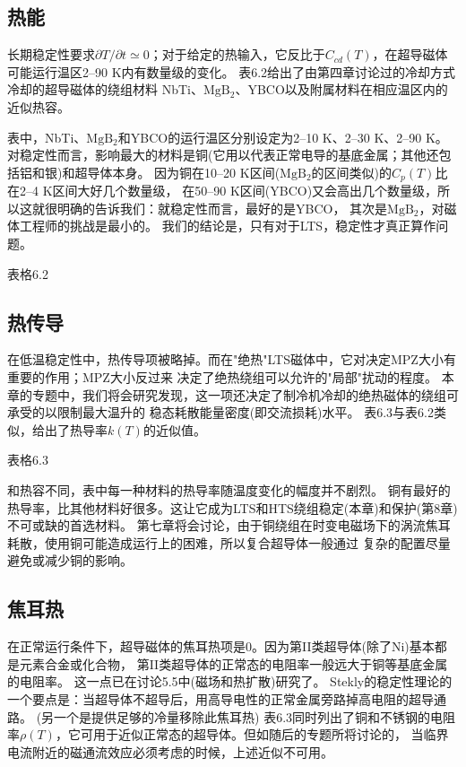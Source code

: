 \subsection{热能}
长期稳定性要求$\partial T/\partial t\simeq 0$；对于给定的热输入，它反比于$C_{cd}(T)$，在超导磁体
可能运行温区2--90 K内有数量级的变化。
表6.2给出了由第四章讨论过的冷却方式冷却的超导磁体的绕组材料
NbTi、$\mathrm{MgB_2}$、YBCO以及附属材料在相应温区内的近似热容。

表中，NbTi、$\mathrm{MgB_2}$和YBCO的运行温区分别设定为2--10 K、2--30 K、2--90 K。
对稳定性而言，影响最大的材料是铜(它用以代表正常电导的基底金属；其他还包括铝和银)和超导体本身。
因为铜在10--20 K区间($\mathrm{MgB_2}$的区间类似)的$C_p(T)$比在2--4 K区间大好几个数量级，
在50--90 K区间(YBCO)又会高出几个数量级，所以这就很明确的告诉我们：就稳定性而言，最好的是YBCO，
其次是$\mathrm{MgB_2}$，对磁体工程师的挑战是最小的。
我们的结论是，只有对于LTS，稳定性才真正算作问题。

表格6.2

\subsection{热传导}
在低温稳定性中，热传导项被略掉。而在"绝热"LTS磁体中，它对决定MPZ大小有重要的作用；MPZ大小反过来
决定了绝热绕组可以允许的"局部"扰动的程度。
本章的专题中，我们将会研究发现，这一项还决定了制冷机冷却的绝热磁体的绕组可承受的以限制最大温升的
稳态耗散能量密度(即交流损耗)水平。
表6.3与表6.2类似，给出了热导率$k(T)$的近似值。

表格6.3

和热容不同，表中每一种材料的热导率随温度变化的幅度并不剧烈。
铜有最好的热导率，比其他材料好很多。这让它成为LTS和HTS绕组稳定(本章)和保护(第8章)不可或缺的首选材料。
第七章将会讨论，由于铜绕组在时变电磁场下的涡流焦耳耗散，使用铜可能造成运行上的困难，所以复合超导体一般通过
复杂的配置尽量避免或减少铜的影响。

\subsection{焦耳热}
在正常运行条件下，超导磁体的焦耳热项是0。因为第II类超导体(除了Ni)基本都是元素合金或化合物，
第II类超导体的正常态的电阻率一般远大于铜等基底金属的电阻率。
这一点已在讨论5.5中(磁场和热扩散)研究了。
Stekly的稳定性理论的一个要点是：当超导体不超导后，用高导电性的正常金属旁路掉高电阻的超导通路。
(另一个是提供足够的冷量移除此焦耳热)
表6.3同时列出了铜和不锈钢的电阻率$\rho(T)$，它可用于近似正常态的超导体。但如随后的专题所将讨论的，
当临界电流附近的磁通流效应必须考虑的时候，上述近似不可用。

